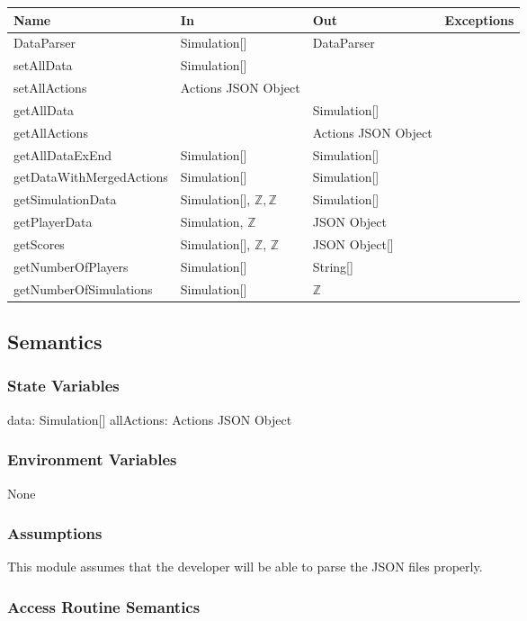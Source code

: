 \documentclass[12pt, titlepage]{article}
\begin{document}
\begin{tabular}{p{5cm} p{4cm} p{4cm} p{3cm}}
\hline
\textbf{Name} & \textbf{In} & \textbf{Out} & \textbf{Exceptions} \\
\hline
DataParser & Simulation[] & DataParser &  \\
setAllData & Simulation[] & & \\
setAllActions & Actions JSON Object & & \\
getAllData & & Simulation[] & \\
getAllActions & & Actions JSON Object & \\
getAllDataExEnd & Simulation[] & Simulation[]  & \\
getDataWithMergedActions & Simulation[] & Simulation[]  & \\
getSimulationData & Simulation[], $\mathbb{Z}, \mathbb{Z}$ & Simulation[]  & \\
getPlayerData & Simulation, $\mathbb{Z}$ & JSON Object  & \\
getScores & Simulation[], $\mathbb{Z}$, $\mathbb{Z}$  & JSON Object[]  & \\
getNumberOfPlayers & Simulation[] & String[]  & \\
getNumberOfSimulations & Simulation[] & $\mathbb{Z}$  & \\
\hline
\end{tabular}

\subsection{Semantics}

\subsubsection{State Variables}
data: Simulation[]
allActions: Actions JSON Object

\subsubsection{Environment Variables}
None

\subsubsection{Assumptions}
This module assumes that the developer will be able to parse the JSON files properly.

\subsubsection{Access Routine Semantics}
\end{document}
